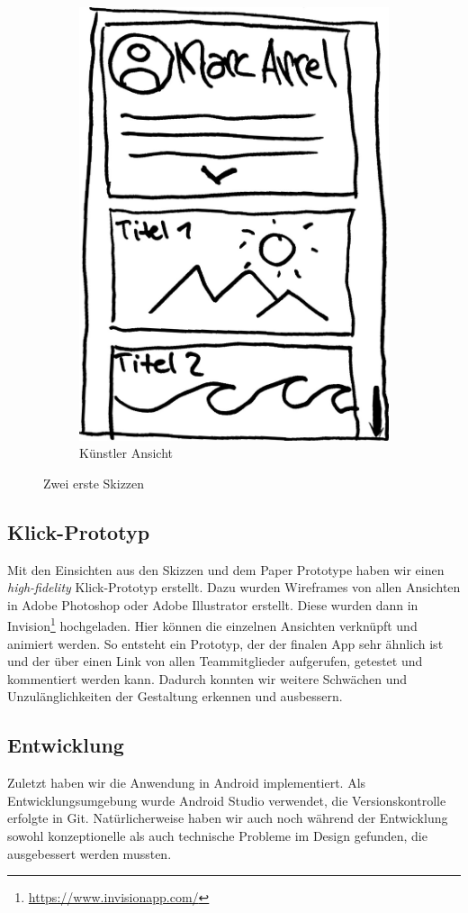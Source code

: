 \begin{figure}[width = 0.45\textwidth]
\begin{subfigure}[b]{0.22\textwidth}
        \includegraphics[width=\textwidth]{figures/kuenstler.jpg}
        \caption{Künstler Ansicht}
        \label{fig:tiger}
    \end{subfigure}
    \caption{Zwei erste Skizzen}
    \label{fig:skizzen}
\end{figure}
\subsection{Klick-Prototyp}
Mit den Einsichten aus den Skizzen und dem Paper Prototype haben wir einen \textit{high-fidelity} Klick-Prototyp erstellt. Dazu wurden Wireframes von allen Ansichten in Adobe Photoshop oder Adobe Illustrator erstellt. Diese wurden dann in Invision\footnote{\url{https://www.invisionapp.com/}} hochgeladen. Hier können die einzelnen Ansichten verknüpft und animiert werden. So entsteht ein Prototyp, der der finalen  App sehr ähnlich ist und der über einen Link von allen Teammitglieder aufgerufen, getestet und kommentiert werden kann. Dadurch konnten wir weitere Schwächen und Unzulänglichkeiten der Gestaltung erkennen und ausbessern.
\subsection{Entwicklung}
Zuletzt haben wir die Anwendung in Android implementiert. Als Entwicklungsumgebung wurde Android Studio verwendet, die Versionskontrolle erfolgte in Git. Natürlicherweise haben wir auch noch während der Entwicklung sowohl konzeptionelle als auch technische Probleme im Design gefunden, die ausgebessert werden mussten.